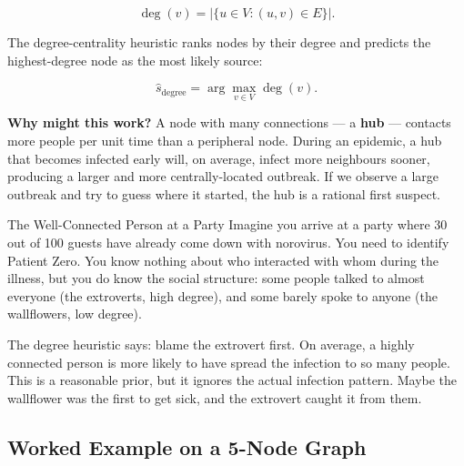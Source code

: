 \begin{equation}
  \deg(v) = |\{u \in V : (u, v) \in E\}|.
  \label{eq:degree}
\end{equation}

The degree-centrality heuristic ranks nodes by their degree and predicts the
highest-degree node as the most likely source:

\begin{equation}
  \hat{s}_{\text{degree}} = \arg\max_{v \in V} \deg(v).
  \label{eq:degree-heuristic}
\end{equation}

\textbf{Why might this work?} A node with many connections --- a \textbf{hub} ---
contacts more people per unit time than a peripheral node. During an epidemic, a hub
that becomes infected early will, on average, infect more neighbours sooner, producing
a larger and more centrally-located outbreak. If we observe a large outbreak and
try to guess where it started, the hub is a rational first suspect.

\begin{analogybox}{The Well-Connected Person at a Party}
Imagine you arrive at a party where 30 out of 100 guests have already come down with
norovirus. You need to identify Patient Zero. You know nothing about who interacted
with whom during the illness, but you do know the social structure: some people talked
to almost everyone (the extroverts, high degree), and some barely spoke to anyone
(the wallflowers, low degree).

The degree heuristic says: blame the extrovert first. On average, a highly connected
person is more likely to have spread the infection to so many people. This is a
reasonable prior, but it ignores the actual infection pattern. Maybe the wallflower
was the first to get sick, and the extrovert caught it from them.
\end{analogybox}

\subsection{Worked Example on a 5-Node Graph}

